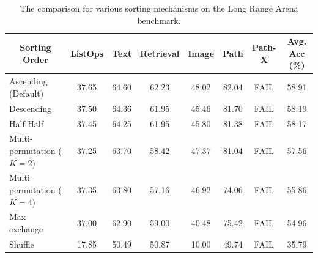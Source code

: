 \begin{table}[t]
  \centering
  \caption{The comparison for various sorting mechanisms on the Long Range Arena benchmark.}
  \small{
    \begin{tabular}{l|cccccc|c}
    \toprule
    \multicolumn{1}{c|}{Sorting Order} & ListOps & Text  & Retrieval & Image & Path  & Path-X & Avg. Acc (\%) \\
    \midrule
    Ascending (Default) & 37.65 & 64.60 & 62.23 & 48.02 & 82.04 & FAIL  & 58.91 \\
    Descending & 37.50 & 64.36 & 61.95 & 45.46 & 81.70 & FAIL  & 58.19 \\
    Half-Half  & 37.45 & 64.25 & 61.95 & 45.80 & 81.38 & FAIL  & 58.17 \\
    Multi-permutation ($K=2$) & 37.25 & 63.70 & 58.42 & 47.37 & 81.04 & FAIL & 57.56\\
    Multi-permutation ($K=4$) & 37.35 & 63.80 & 57.16 & 46.92 & 74.06 & FAIL & 55.86\\
    Max-exchange & 37.00 & 62.90 & 59.00 & 40.48 & 75.42 & 
    FAIL  & 54.96 \\
    Shuffle & 17.85 & 50.49 & 50.87 & 10.00 & 49.74 & FAIL  & 35.79 \\
    \bottomrule
    \end{tabular}%
  \label{tab:order}%
  }
\end{table}%

